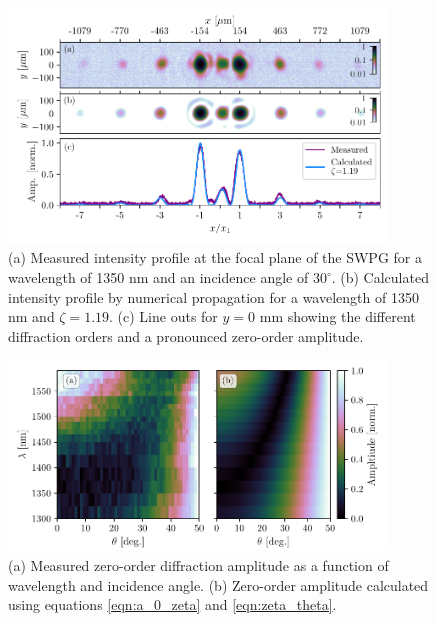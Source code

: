 \begin{figure}
	\centering
	\includegraphics[width=0.9\textwidth]{figures/Two_source/focus_imgs_zero_order.pdf}
	\caption[Measured and calculated intensity profile at the focal plane when using the SWPG]{(a) Measured intensity profile at the focal plane of the SWPG for a wavelength of 1350 nm and an incidence angle of $30^{\circ}$.  (b) Calculated intensity profile by numerical propagation for a wavelength of 1350 nm and $\zeta=1.19$.  (c) Line outs for $y=0$ mm showing the different diffraction orders and a pronounced zero-order amplitude.}
	\label{fig:focus_imgs_zero_order}
\end{figure}


\begin{figure}
	\centering
	\includegraphics[width=0.9\textwidth]{figures/Two_source/zero_order_amp_measured.pdf}
	\caption[Measured zero-order diffraction amplitude as a function of wavelength and incidence angle]{(a) Measured zero-order diffraction amplitude as a function of wavelength and incidence angle.  (b) Zero-order amplitude calculated using equations \ref{eqn:a_0_zeta} and \ref{eqn:zeta_theta}.}
	\label{fig:measured_zero_order}
\end{figure}


